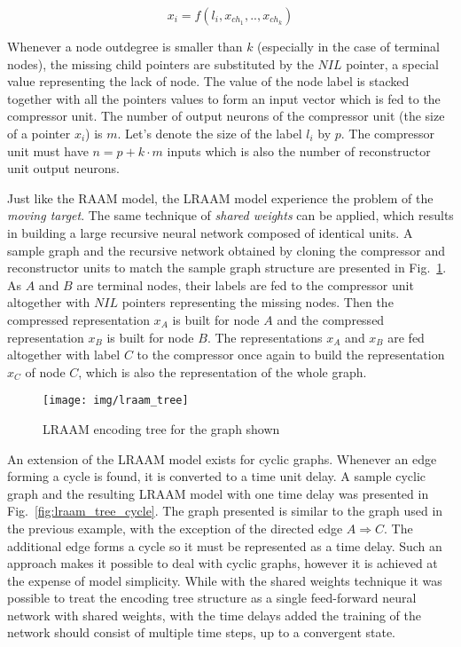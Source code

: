 \begin{equation}
x_i = f(l_i, x_{ch_1}, .., x_{ch_k})
\label{eq:lraam_pointer}
\end{equation}

Whenever a node outdegree is smaller than $k$ (especially in the case of terminal nodes), the missing child pointers are substituted by the $NIL$ pointer, a special value representing the lack of node. The value of the node label is stacked together with all the pointers values to form an input vector which is fed to the compressor unit. The number of output neurons of the compressor unit (the size of a pointer $x_i$) is $m$. Let's denote the size of the label $l_i$ by $p$. The compressor unit must have $n = p + k \cdot m$ inputs which is also the number of reconstructor unit output neurons.

Just like the RAAM model, the LRAAM model experience the problem of the \emph{moving target}. The same technique of \emph{shared weights} can be applied, which results in building a large recursive neural network composed of identical units. A sample graph and the recursive network obtained by cloning the compressor and reconstructor units to match the sample graph structure are presented in Fig.~\ref{fig:lraam_tree}. As $A$ and $B$ are terminal nodes, their labels are fed to the compressor unit altogether with $NIL$ pointers representing the missing nodes. Then the compressed representation $x_{A}$ is built for node $A$ and the compressed representation $x_{B}$ is built for node $B$. The representations $x_A$ and $x_B$ are fed altogether with label $C$ to the compressor once again to build the representation $x_C$ of node $C$, which is also the representation of the whole graph.

\begin{figure}
\begin{center}
	\texttt{[image: img/lraam\_tree]}
	\caption{LRAAM encoding tree for the graph shown}
	\label{fig:lraam_tree}
\end{center}
\end{figure}

An extension of the LRAAM model exists for cyclic graphs. Whenever an edge forming a cycle is found, it is converted to a time unit delay. A sample cyclic graph and the resulting LRAAM model with one time delay was presented in Fig.~\ref{fig:lraam_tree_cycle}. The graph presented is similar to the graph used in the previous example, with the exception of the directed edge $A \Rightarrow C$. The additional edge forms a cycle so it must be represented as a time delay. Such an approach makes it possible to deal with cyclic graphs, however it is achieved at the expense of model simplicity. While with the shared weights technique it was possible to treat the encoding tree structure as a single feed-forward neural network with shared weights, with the time delays added the training of the network should consist of multiple time steps, up to a convergent state.

